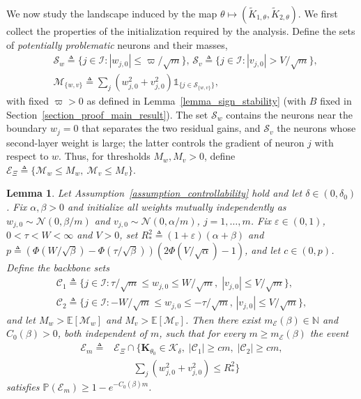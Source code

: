 \documentclass[letterpaper, 10 pt, conference]{ieeeconf}
\newcommand{\E}{\mathbb{E}}
\newcommand{\N}{\mathbb{N}}
\newcommand{\Prob}{\mathbb{P}}
\newcommand{\bK}{\mathbf{K}}
\newcommand{\cC}{\mathcal{C}}
\newcommand{\cE}{\mathcal{E}}
\newcommand{\cK}{\mathcal{K}}
\newcommand{\cM}{\mathcal{M}}
\newcommand{\cN}{\mathcal{N}}
\newcommand{\cS}{\mathcal{S}}
\newcommand{\sI}{\mathscr{I}}
\newcommand{\ind}[1]{\mathds{1}_{#1}}
\newtheorem{lemma}{Lemma}
\newcommand{\Assum}{Assumption}
\newcommand{\Lemm}{Lemma}
\newcommand{\Sect}{Section}
\begin{document}
We now study the landscape induced by the map $\theta \mapsto (\widetilde{K}_{1,\theta}, \widetilde{K}_{2,\theta})$. We first collect the properties of the initialization required by the analysis. Define the sets of \emph{potentially problematic} neurons and their masses,
\begin{align} \label{eq_bad_sets}
        &\cS_{w} {\triangleq} \{ j {\in} \sI : |w_{j,0}| {\le} \varpi/\sqrt{m}\},\,
        \cS_{v} {\triangleq} \{ j {\in} \sI : |v_{j,0}| {>} V/\sqrt{m}\},
         \nonumber \\
        &\cM_{ \{w,v\}} {\triangleq} {\textstyle\sum_{j}} (w_{j,0}^{2} {+} v_{j,0}^{2})\ind{\{j\in \cS_{ \{w,v\}}\}},
\end{align}
with fixed $\varpi>0$ as defined in \Lemm~\ref{lemma_sign_stability} (with $B$ fixed in \Sect~\ref{section_proof_main_result}). The set $\cS_{w}$ contains the neurons near the boundary $w_{j}=0$ that separates the two residual gains, and $\cS_{v}$ the neurons whose second-layer weight is large; the latter controls the gradient of neuron $j$ with respect to $w$. Thus, for thresholds $M_w, M_v{>}0$, define $\cE_{\Xi} {\triangleq} \{\cM_{w} {\le} M_{w},\ \cM_{v} {\le} M_{v}\}$.
 
\begin{lemma}\label{lemma_initialization}
    Let \Assum~\ref{assumption_controllability} hold and let $\delta \in (0,\delta_{0})$. Fix $\alpha,\beta>0$ and initialize all weights mutually independently as $w_{j,0} \sim \cN(0,\beta/m)$ and $v_{j,0}\sim\cN(0,\alpha/m)$, $j = 1,\dots,m$. Fix $\varepsilon \in (0,1)$, $0 < \tau < W < \infty$ and $V>0$, set $R_{\ast}^{2} \triangleq (1+\varepsilon)(\alpha+\beta)$ and
    $
        p \triangleq ( \Phi ( {W}/{\sqrt{\beta}} ) - \Phi ( {\tau}/{\sqrt{\beta}} ) ) (2 \Phi ( {V}/{\sqrt{\alpha}} ) - 1 )
    $,
    and let $c \in (0,p)$. Define the backbone sets
    \begin{equation} \label{eq_backbone}
        \begin{gathered}
        \cC_1 {\triangleq} \big\{ j \in \sI : {\tau}/{\sqrt{m}} \le w_{j, 0} \le {W}/{\sqrt{m}}, \; |v_{j, 0} | \le {V}/{\sqrt{m}} \big\},
        \\
        \cC_2 {\triangleq} \big\{ j \in \sI : {-W}/{\sqrt{m}} {\le} w_{j, 0} {\le} {-\tau}/{\sqrt{m}},\, |v_{j, 0}| {\le} {V}/{\sqrt{m}} \big\},
        \end{gathered}
    \end{equation}
    and let $M_{w} > \E[\cM_{w}]$ and $M_{v} > \E[\cM_{v}]$. Then there exist $m_{\cE}(\beta) \in \N$ and $C_{0}(\beta)>0$, both independent of $m$, such that for every $m \ge m_{\cE}(\beta)$ the event
\begin{equation}\label{eq_good_event}
\begin{aligned}
\cE_m\triangleq{}&\cE_\Xi\cap
\bigl\{\bK_{\theta_0}\in\cK_\delta,\;
 |\cC_1|\ge cm,\;|\cC_2|\ge cm,\\
&\hspace{2em}\textstyle\sum_j(w_{j,0}^2+v_{j,0}^2)\le R_\ast^2\bigr\}
\end{aligned}
\end{equation}
satisfies $\Prob(\cE_{m})\ge 1-e^{-C_{0}(\beta) m}$.
\end{lemma}
 
\end{document}
